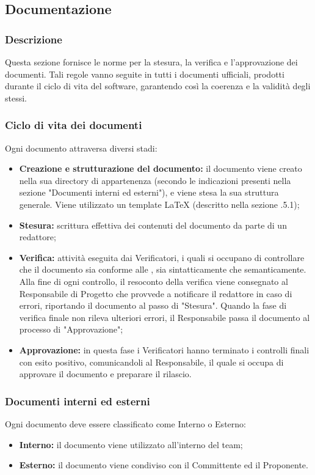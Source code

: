 \subsection{Documentazione}
    \subsubsection{Descrizione}
      Questa sezione fornisce le norme per la stesura, la verifica e l'approvazione dei documenti. Tali regole vanno seguite in tutti i documenti ufficiali, prodotti durante il ciclo di vita del software, garantendo così la coerenza e la validità degli stessi.

    \subsubsection{Ciclo di vita dei documenti}
      Ogni documento attraversa diversi stadi:
      \begin{itemize}
        \item \textbf{Creazione e strutturazione del documento:} il documento viene creato nella sua directory di appartenenza (secondo le indicazioni presenti nella sezione "Documenti interni ed esterni"), e viene stesa la sua struttura generale. Viene utilizzato un template \LaTeX{} (descritto nella sezione .5.1);
        \item \textbf{Stesura:} scrittura effettiva dei contenuti del documento da parte di un redattore;
        \item \textbf{Verifica:} attività eseguita dai Verificatori, i quali si occupano di controllare che il documento sia conforme alle \textit{\NdP{}}, sia sintatticamente che semanticamente. Alla fine di ogni controllo, il resoconto della verifica viene consegnato al Responsabile di Progetto che provvede a notificare il redattore in caso di errori, riportando il documento al passo di "Stesura". Quando la fase di verifica finale non rileva ulteriori errori, il Responsabile passa il documento al processo di "Approvazione";
        \item \textbf{Approvazione:} in questa fase i Verificatori hanno terminato i controlli finali con esito positivo, comunicandoli al Responsabile, il quale si occupa di approvare il documento e preparare il rilascio.
      \end{itemize}

    \subsubsection{Documenti interni ed esterni}
      Ogni documento deve essere classificato come Interno o Esterno:
      \begin{itemize}
        \item \textbf{Interno:} il documento viene utilizzato all'interno del team;
        \item \textbf{Esterno:} il documento viene condiviso con il Committente ed il Proponente.
      \end{itemize}

